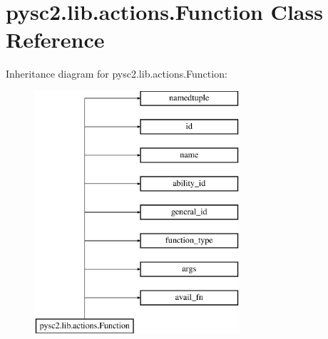 \hypertarget{classpysc2_1_1lib_1_1actions_1_1_function}{}\section{pysc2.\+lib.\+actions.\+Function Class Reference}
\label{classpysc2_1_1lib_1_1actions_1_1_function}
Inheritance diagram for pysc2.\+lib.\+actions.\+Function\+:\begin{figure}[H]
\begin{center}
\leavevmode
\includegraphics[height=9.000000cm]{classpysc2_1_1lib_1_1actions_1_1_function}
\end{center}
\end{figure}
